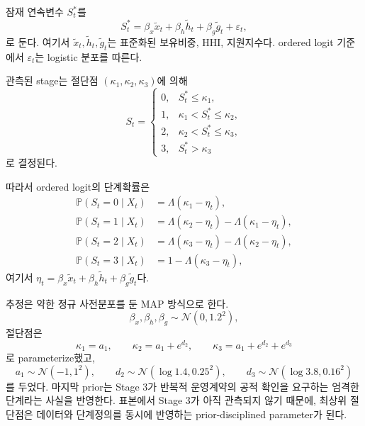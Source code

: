 \documentclass[11pt,a4paper]{article}
\newcommand{\Prob}{\mathbb{P}}
\begin{document}
잠재 연속변수 $S_t^*$를
\begin{equation}
S_t^* = \beta_x \tilde x_t + \beta_h \tilde h_t + \beta_g \tilde g_t + \varepsilon_t,
\end{equation}
로 둔다. 여기서 $\tilde x_t, \tilde h_t, \tilde g_t$는 표준화된 보유비중, HHI, 지원지수다. ordered logit 기준에서 $\varepsilon_t$는 logistic 분포를 따른다.

관측된 stage는 절단점 $(\kappa_1,\kappa_2,\kappa_3)$에 의해
\begin{equation}
S_t=
\begin{cases}
0, & S_t^* \le \kappa_1, \\
1, & \kappa_1 < S_t^* \le \kappa_2, \\
2, & \kappa_2 < S_t^* \le \kappa_3, \\
3, & S_t^* > \kappa_3
\end{cases}
\end{equation}
로 결정된다.

따라서 ordered logit의 단계확률은
\begin{align}
\Prob(S_t=0\mid X_t) &= \Lambda(\kappa_1-\eta_t), \\
\Prob(S_t=1\mid X_t) &= \Lambda(\kappa_2-\eta_t)-\Lambda(\kappa_1-\eta_t), \\
\Prob(S_t=2\mid X_t) &= \Lambda(\kappa_3-\eta_t)-\Lambda(\kappa_2-\eta_t), \\
\Prob(S_t=3\mid X_t) &= 1-\Lambda(\kappa_3-\eta_t),
\end{align}
여기서 $\eta_t = \beta_x \tilde x_t + \beta_h \tilde h_t + \beta_g \tilde g_t$다.

추정은 약한 정규 사전분포를 둔 MAP 방식으로 한다.
\begin{equation}
\beta_x,\beta_h,\beta_g \sim \mathcal{N}(0,1.2^2),
\end{equation}
절단점은
\begin{equation}
\kappa_1 = a_1, \qquad \kappa_2 = a_1 + e^{d_2}, \qquad \kappa_3 = a_1 + e^{d_2} + e^{d_3}
\end{equation}
로 parameterize했고,
\begin{equation}
 a_1 \sim \mathcal{N}(-1,1^2),\qquad d_2 \sim \mathcal{N}(\log 1.4,0.25^2),\qquad d_3 \sim \mathcal{N}(\log 3.8,0.16^2)
\end{equation}
를 두었다. 마지막 prior는 Stage 3가 반복적 운영계약의 공적 확인을 요구하는 엄격한 단계라는 사실을 반영한다. 표본에서 Stage 3가 아직 관측되지 않기 때문에, 최상위 절단점은 데이터와 단계정의를 동시에 반영하는 prior-disciplined parameter가 된다.
\end{document}
